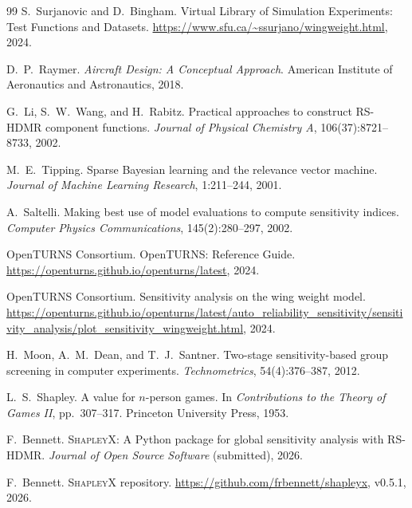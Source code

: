 \documentclass[11pt,a4paper]{article}
\begin{document}
\begin{thebibliography}{99}
S.~Surjanovic and D.~Bingham.
\newblock Virtual Library of Simulation Experiments: Test Functions and Datasets.
\newblock \url{https://www.sfu.ca/~ssurjano/wingweight.html}, 2024.

D.~P.~Raymer.
\newblock \textit{Aircraft Design: A Conceptual Approach}.
\newblock American Institute of Aeronautics and Astronautics, 2018.

G.~Li, S.~W.~Wang, and H.~Rabitz.
\newblock Practical approaches to construct RS-HDMR component functions.
\newblock \textit{Journal of Physical Chemistry A}, 106(37):8721--8733, 2002.

M.~E.~Tipping.
\newblock Sparse Bayesian learning and the relevance vector machine.
\newblock \textit{Journal of Machine Learning Research}, 1:211--244, 2001.

A.~Saltelli.
\newblock Making best use of model evaluations to compute sensitivity indices.
\newblock \textit{Computer Physics Communications}, 145(2):280--297, 2002.

OpenTURNS Consortium.
\newblock OpenTURNS: Reference Guide.
\newblock \url{https://openturns.github.io/openturns/latest}, 2024.

OpenTURNS Consortium.
\newblock Sensitivity analysis on the wing weight model.
\newblock \url{https://openturns.github.io/openturns/latest/auto_reliability_sensitivity/sensitivity_analysis/plot_sensitivity_wingweight.html}, 2024.

H.~Moon, A.~M.~Dean, and T.~J.~Santner.
\newblock Two-stage sensitivity-based group screening in computer experiments.
\newblock \textit{Technometrics}, 54(4):376--387, 2012.

L.~S.~Shapley.
\newblock A value for $n$-person games.
\newblock In \textit{Contributions to the Theory of Games II}, pp.\ 307--317. Princeton University Press, 1953.

F.~Bennett.
\newblock \textsc{ShapleyX}: A Python package for global sensitivity analysis with RS-HDMR.
\newblock \textit{Journal of Open Source Software} (submitted), 2026.

F.~Bennett.
\newblock \textsc{ShapleyX} repository.
\newblock \url{https://github.com/frbennett/shapleyx}, v0.5.1, 2026.

\end{thebibliography}
\end{document}
